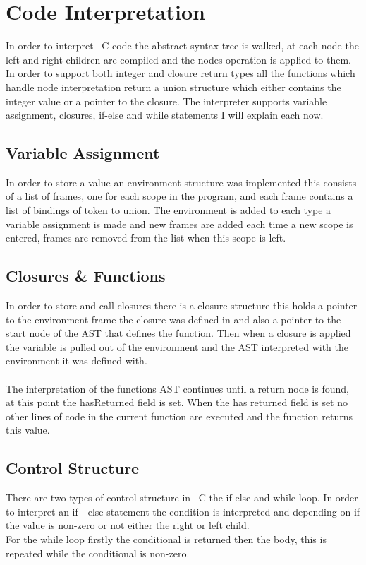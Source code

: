\documentclass{article}
\begin{document}
\newpage
\section{Code Interpretation}

In order to interpret --C code the abstract syntax tree is walked, at each node
the left and right children are compiled and the nodes operation is applied to them.
In order to support both integer and closure return types all the functions which handle
node interpretation return a union structure which either contains the integer value or
a pointer to the closure. The interpreter supports variable assignment, closures, if-else and while
statements I will explain each now.

\subsection{Variable Assignment}
In order to store a value an environment structure was implemented this consists
of a list of frames, one for each scope in the program, and each frame contains a
list of bindings of token to union. The environment is added to each type a variable
assignment is made and new frames are added each time a new scope is entered, frames are
removed from the list when this scope is left.

\subsection{Closures \& Functions}
In order to store and call closures there is a closure structure this holds a pointer
to the environment frame the closure was defined in and also a pointer to the start node
of the AST that defines the function. Then when a closure is applied the variable is pulled
out of the environment and the AST interpreted with the environment it was defined with.\\~\\
The interpretation of the functions AST continues until a return node is found, at
this point the hasReturned field is set. When the has returned field is set
no other lines of code in the current function are executed and the function returns this
value.

\subsection{Control Structure}
There are two types of control structure in --C the if-else and while loop.
In order to interpret an if - else statement the condition is interpreted and depending on
if the value is non-zero or not either the right or left child.\\
For the while loop firstly the conditional is returned then the body, this is repeated
while the conditional is non-zero.
\end{document}

